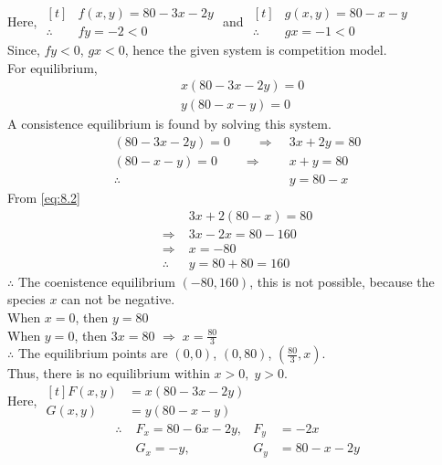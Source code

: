 \documentclass[../main-sheet.tex]{subfiles}
\begin{document}
\begin{soln}
    Here, \(\begin{aligned}[t]
        &f(x,y)=80-3x-2y\\
        \therefore\;&fy=-2<0
    \end{aligned}\)  and \(\begin{aligned}[t]
        &g(x,y)=80-x-y\\
        \therefore\;&gx=-1<0
    \end{aligned}\)\\

    
    Since, \(fy<0\), \(gx<0\), hence the given system is competition model.\\
    For equilibrium,
    \begin{align*}
        &x(80-3x-2y)=0\\
        &y(80-x-y)=0
    \end{align*}
    A consistence equilibrium is found by solving this system.
    \begin{align}
        (80-3x-2y)=0\qquad\Rightarrow\;& 3x+2y=80\label{eq:8.2}\\
        (80-x-y)=0\qquad\Rightarrow\;& x+y=80\nonumber\\
        \therefore\;& y=80-x\label{eq:8.3}
    \end{align}
    From \eqref{eq:8.2}
    \begin{align*}
        &3x+2(80-x)=80\\
        \Rightarrow\;&3x-2x=80-160\\
        \Rightarrow\;&x=-80\\
        \therefore\;&y=80+80=160
    \end{align*}
    \(\therefore\) The coenistence equilibrium \((-80,160)\), this is not possible, because the species \(x\) can not be negative.\\
    When \(x=0\), then \(y=80\)\\
    When \(y=0\), then \(3x=80\) \(\Rightarrow\;x=\frac{80}{3}\)\\


    \(\therefore\) The equilibrium points are \((0,0)\), \((0,80)\), \((\frac{80}{3},x)\).\\

    Thus, there is no equilibrium within \(x>0,\;y>0\).\\

    Here, \(\begin{aligned}[t]
        F(x,y)&=x(80-3x-2y)\\
        G(x,y)&=y(80-x-y)
    \end{aligned}\)\\
    \begin{align*}
        \therefore\;&F_x=80-6x-2y, &F_y&=-2x\\
        &G_x=-y, &G_y&=80-x-2y
    \end{align*}



\end{soln}
\end{document}
